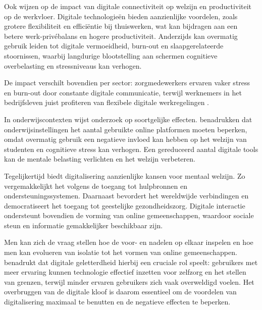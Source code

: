\vspace{1em}

Ook \textcite{Bondanini2025} wijzen op de impact van digitale connectiviteit op welzijn en productiviteit op de werkvloer. Digitale technologieën bieden aanzienlijke voordelen, zoals grotere flexibiliteit en efficiëntie bij thuiswerken, wat kan bijdragen aan een betere werk-privébalans en hogere productiviteit. Anderzijds kan overmatig gebruik leiden tot digitale vermoeidheid, burn-out en slaapgerelateerde stoornissen, waarbij langdurige blootstelling aan schermen cognitieve overbelasting en stressniveaus kan verhogen. 

\newpage

De impact verschilt bovendien per sector: zorgmedewerkers ervaren vaker stress en burn-out door constante digitale communicatie, terwijl werknemers in het bedrijfsleven juist profiteren van flexibele digitale werkregelingen \autocite{Bondanini2025}.

\vspace{1em}

In onderwijscontexten wijst onderzoek op soortgelijke effecten. \textcite{Ibrahim2025} benadrukken dat onderwijsinstellingen het aantal gebruikte online platformen moeten beperken, omdat overmatig gebruik een negatieve invloed kan hebben op het welzijn van studenten en cognitieve stress kan verhogen. Een gereduceerd aantal digitale tools kan de mentale belasting verlichten en het welzijn verbeteren.

\vspace{1em}

Tegelijkertijd biedt digitalisering aanzienlijke kansen voor mentaal welzijn. Zo vergemakkelijkt het volgens \textcite{Malik2025} de toegang tot hulpbronnen en ondersteuningssystemen. Daarnaast bevordert het wereldwijde verbindingen en democratiseert het toegang tot geestelijke gezondheidszorg. Digitale interactie ondersteunt bovendien de vorming van online gemeenschappen, waardoor sociale steun en informatie gemakkelijker beschikbaar zijn.

\vspace{1em}

Men kan zich de vraag stellen hoe de voor- en nadelen op elkaar inspelen en hoe men kan evolueren van isolatie tot het vormen van online gemeenschappen. \textcite{Malik2025} benadrukt dat digitale geletterdheid hierbij een cruciale rol speelt: gebruikers met meer ervaring kunnen technologie effectief inzetten voor zelfzorg en het stellen van grenzen, terwijl minder ervaren gebruikers zich vaak overweldigd voelen. Het overbruggen van de digitale kloof is daarom essentieel om de voordelen van digitalisering maximaal te benutten en de negatieve effecten te beperken.

